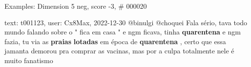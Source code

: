 \begin{frame}{Examples: Dimension 5 neg, score -3, \# 000020}
\footnotesize
\begin{alertblock}{text: t001123, user: Cx8Max, 2022-12-30}
@binulgi @choquei Fala sério, tava todo mundo falando sobre o " fica em casa " 
e ngm ficava, tinha \textbf{quarentena} e ngm fazia, tu via as \textbf{praias} 
\textbf{lotadas} em época de \textbf{quarentena} , certo que essa jamanta 
demorou pra comprar as vacinas, mas por a culpa totalmente nele é muito 
fanatismo 
\end{alertblock}
\end{frame}
